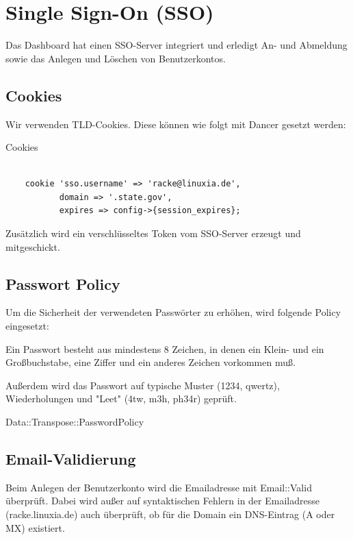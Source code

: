\section{Single Sign-On (SSO)}

Das Dashboard hat einen SSO-Server integriert und erledigt An- und
Abmeldung sowie das Anlegen und Löschen von Benutzerkontos.

\subsection{Cookies}

Wir verwenden TLD-Cookies. Diese können wie folgt mit Dancer
gesetzt werden:

\begin{frame}[fragile]{Cookies}
\begin{lstlisting}

    cookie 'sso.username' => 'racke@linuxia.de',
           domain => '.state.gov',
           expires => config->{session_expires};

\end{lstlisting}
\end{frame}

Zusätzlich wird ein verschlüsseltes Token vom SSO-Server
erzeugt und mitgeschickt.                       
                       
\subsection{Passwort Policy}

Um die Sicherheit der verwendeten Passwörter zu erhöhen, wird
folgende Policy eingesetzt:

Ein Passwort besteht aus mindestens 8 Zeichen, in denen
ein Klein- und ein Großbuchstabe, eine Ziffer und ein
anderes Zeichen vorkommen muß.

Außerdem wird das Passwort auf typische Muster (1234, qwertz),
Wiederholungen und "Leet" (4tw, m3h, ph34r) geprüft.

Data::Transpose::PasswordPolicy

\subsection{Email-Validierung}

Beim Anlegen der Benutzerkonto wird die Emailadresse
mit Email::Valid überprüft. Dabei wird außer auf
syntaktischen Fehlern in der Emailadresse (racke.linuxia.de)
auch überprüft, ob für die Domain ein DNS-Eintrag (A oder MX)
existiert.                       

